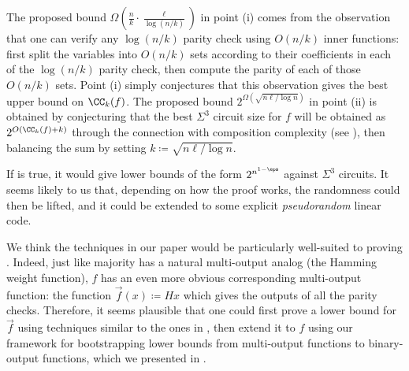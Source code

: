 The proposed bound $\Omega(\frac{n}{k} \cdot \frac{\ell}{\log(n/k)})$ in point (i) comes from the observation that one can verify any $\log(n/k)$ parity check using $O(n/k)$ inner functions: first split the variables into $O(n/k)$ sets according to their coefficients in each of the $\log(n/k)$ parity check, then compute the parity of each of those $O(n/k)$ sets.
Point (i) simply conjectures that this observation gives the best upper bound on $\CC_k(f)$.
The proposed bound $2^{\Omega(\sqrt{n\ell / \log n})}$ in point (ii) is obtained by conjecturing that the best $\Sigma^3$ circuit size for $f$ will be obtained as $2^{O(\CC_k(f) + k)}$ through the connection with composition complexity (see ), then balancing the sum by setting $k \coloneqq \sqrt{n \ell / \log n}$.

If  is true, it would give lower bounds of the form $2^{n^{1-\eps}}$ against $\Sigma^3$ circuits.
It seems likely to us that, depending on how the proof works, the randomness could then be lifted, and it could be extended to some explicit \emph{pseudorandom} linear code.

We think the techniques in our paper would be particularly well-suited to proving .
Indeed, just like majority has a natural multi-output analog (the Hamming weight function), $f$ has an even more obvious corresponding multi-output function: the function $\Vec{f}(x) \coloneqq Hx$ which gives the outputs of all the parity checks.
Therefore, it seems plausible that one could first prove a lower bound for $\Vec{f}$ using techniques similar to the ones in , then extend it to $f$ using our framework for bootstrapping lower bounds from multi-output functions to binary-output functions, which we presented in .
